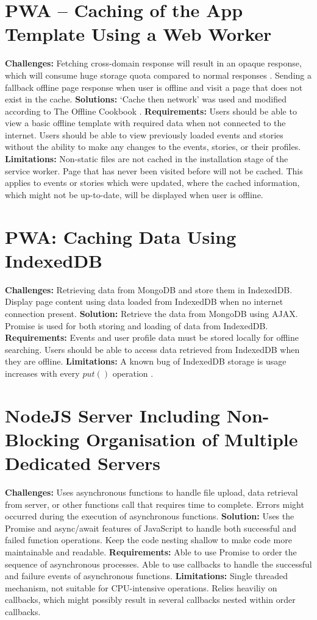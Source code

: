 \documentclass[11pt, a4paper]{article}
\begin{document}
\section{PWA – Caching of the App Template Using a Web Worker}
\textbf{Challenges:} Fetching cross-domain response will result in an opaque response, which will
consume huge storage quota compared to normal responses \cite{opaque_workbox}. Sending a fallback
offline page response when user is offline and visit a page that does not exist in the cache.
\textbf{Solutions:} `Cache then network' was used and modified according to The Offline Cookbook
\cite{offline_cookbook}. \textbf{Requirements:} Users should be able to view a basic offline
template with required data when not connected to the internet. Users should be able to view
previously loaded events and stories without the ability to make any changes to the events, stories,
or their profiles. \textbf{Limitations:} Non-static files are not cached in the installation stage
of the service worker. Page that has never been visited before will not be cached. This applies to
events or stories which were updated, where the cached information, which might not be up-to-date,
will be displayed when user is offline.

\section{PWA: Caching Data Using IndexedDB}
\textbf{Challenges:} Retrieving data from MongoDB and store them in IndexedDB. Display page content
using data loaded from IndexedDB when no internet connection present. \textbf{Solution:} Retrieve
the data from MongoDB using AJAX. Promise is used for both storing and loading of data from
IndexedDB. \textbf{Requirements:} Events and user profile data must be stored locally for offline
searching. Users should be able to access data retrieved from IndexedDB when they are offline.
\textbf{Limitations:} A known bug of IndexedDB storage is usage increases with every $put()$
operation \cite{leveldb_593, leveldb_603}.

\section{NodeJS Server Including Non-Blocking Organisation of Multiple Dedicated Servers}
\textbf{Challenges:} Uses asynchronous functions to handle file upload, data retrieval from server,
or other functions call that requires time to complete. Errors might occurred during the execution
of asynchronous functions. \textbf{Solution:} Uses the Promise and async/await features of
JavaScript to handle both successful and failed function operations. Keep the code nesting shallow
to make code more maintainable and readable. \textbf{Requirements:} Able to use Promise to order the
sequence of asynchronous processes. Able to use callbacks to handle the successful and failure
events of asynchronous functions. \textbf{Limitations:} Single threaded mechanism, not suitable for
CPU-intensive operations. Relies heaviliy on callbacks, which might possibly result in several
callbacks nested within order callbacks.
\end{document}
